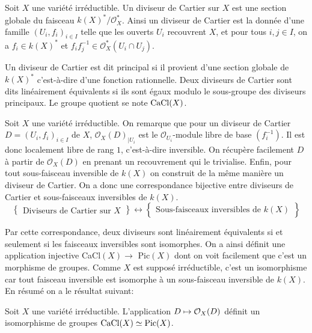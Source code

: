 \begin{defn}
Soit $X$ une variété irréductible. Un diviseur de Cartier sur $X$ est une section globale du faisceau $k(X)^*/\mathcal{O}_X^*$. Ainsi un diviseur de Cartier est la donnée d'une famille $(U_i, f_i)_{i\in I}$ telle que les ouverts $U_i$ recouvrent $X$, et pour tous $i,j \in I$, on a $f_i\in k(X)^*$ et $f_if_j^{-1}\in \mathcal{O}_X^*(U_i\cap U_j)$.

Un diviseur de Cartier est dit principal si il provient d'une section globale de $k(X)^*$ c'est-à-dire d'une fonction rationnelle. Deux diviseurs de Cartier sont dits linéairement équivalents si ils sont égaux modulo le sous-groupe des diviseurs principaux. Le groupe quotient se note $\operatorname{CaCl}(X)$.
\end{defn}





Soit $X$ une variété irréductible. On remarque que pour un diviseur de Cartier $D=(U_i, f_i)_{i\in I}$ de $X$, $\mathcal{O}_X(D)_{|U_i}$ est le $\mathcal{O}_{U_i}$-module libre de base $(f_i^{-1})$. Il est donc localement libre de rang $1$, c'est-à-dire inversible. On récupère facilement $D$ à partir de $\mathcal{O}_X(D)$ en prenant un recouvrement qui le trivialise. Enfin, pour tout sous-faisceau inversible de $k(X)$ on construit de la même manière un diviseur de Cartier. On a donc une correspondance bijective entre diviseurs de Cartier et sous-faisceaux inversibles de $k(X)$. 
$$
\left\{
\begin{matrix}
\text{Diviseurs de Cartier sur }X
\end{matrix}
\right\}
\leftrightarrow
\left\{
\begin{matrix}
\text{Sous-faisceaux inversibles de } k(X)
\end{matrix}
\right\}
$$

Par cette correspondance, deux diviseurs sont linéairement équivalents si et seulement si les faisceaux inversibles sont isomorphes. On a ainsi définit une application injective CaCl$(X)\rightarrow$ Pic$(X)$ dont on voit facilement que c'est un morphisme de groupes. Comme $X$ est supposé irréductible, c'est un isomorphisme car tout faisceau inversible est isomorphe à un sous-faisceau inversible de $k(X)$. En résumé on a le résultat suivant:


\begin{prop}\label{isopic}
Soit $X$ une variété irréductible. L'application $D\mapsto \mathcal{O}_X(D)$ définit un isomorphisme de groupes $\operatorname{CaCl}(X)\simeq \operatorname{Pic}(X)$.
\end{prop}


